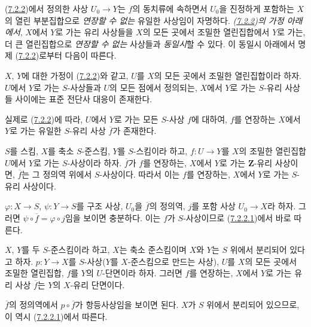 (\hyperref[I.7.2.2-ko]{7.2.2})에서 정의한 사상 $U_0\to Y$는 $f$의
동치류에 속하면서 $U_0$을 진정하게 포함하는 $X$의 열린 부분집합으로
\emph{연장할 수 없는} 유일한 사상임이 자명하다.
\emph{(\hyperref[I.7.2.2-ko]{7.2.2})의 가정 아래에서}, $X$에서 $Y$로
가는 유리 사상들을 $X$의 모든 곳에서 조밀한 열린집합에서 $Y$로 가는,
더 큰 열린집합으로 \emph{연장할 수 없는} 사상들과 \emph{동일시}할 수
있다. 이 동일시 아래에서 명제
(\hyperref[I.7.2.2-ko]{7.2.2})로부터 다음이 따른다.

\begin{corollary}[7.2.3]
\label{I.7.2.3-ko}
$X$, $Y$에 대한 가정이 (\hyperref[I.7.2.2-ko]{7.2.2})와 같고,
$U$를 $X$의 모든 곳에서 조밀한 열린집합이라 하자. $U$에서 $Y$로
가는 $S$-사상들과 $U$의 모든 점에서 정의되는, $X$에서 $Y$로 가는
$S$-유리 사상들 사이에는 표준 전단사 대응이 존재한다.
\end{corollary}

실제로 (\hyperref[I.7.2.2-ko]{7.2.2})에 따라, $U$에서 $Y$로 가는 모든
$S$-사상 $f$에 대하여, $f$를 연장하는 $X$에서 $Y$로 가는 유일한 $S$-유리 사상
$\overline f$가 존재한다.

\begin{corollary}[7.2.4]
\label{I.7.2.4-ko}
$S$를 스킴, $X$를 축소 $S$-준스킴, $Y$를 $S$-스킴이라 하고,
$f:U\to Y$를 $X$의 조밀한 열린집합 $U$에서 $Y$로 가는 $S$-사상이라
하자. $\overline f$가 $f$를 연장하는, $X$에서 $Y$로 가는
$\mathbf{Z}$-유리 사상이면, $\overline f$는 그 정의역 위에서
$S$-사상이다. 따라서 이는 $f$를 연장하는, $X$에서 $Y$로 가는
$S$-유리 사상이다.
\end{corollary}

$\varphi:X\to S$, $\psi:Y\to S$를 구조 사상, $U_0$을 $\overline f$의
정의역, $j$를 포함 사상 $U_0\to X$라 하자. 그러면
$\psi\circ\overline f=\varphi\circ j$임을 보이면 충분하다. 이는 $f$가
$S$-사상이므로 (\hyperref[I.7.2.2.1-ko]{7.2.2.1})에서 바로 따른다.

\begin{corollary}[7.2.5]
\label{I.7.2.5-ko}
$X$, $Y$를 두 $S$-준스킴이라 하고, $X$는 축소 준스킴이며 $X$와 $Y$는
$S$ 위에서 분리되어 있다고 하자. $p:Y\to X$를 $S$-사상($Y$를
$X$-준스킴으로 만드는 사상), $U$를 $X$의 모든 곳에서 조밀한
열린집합, $f$를 $Y$의 $U$-단면이라 하자. 그러면 $f$를 연장하는,
$X$에서 $Y$로 가는 유리 사상 $\overline f$는 $Y$의 $X$-유리
단면이다.
\end{corollary}

$\overline f$의 정의역에서 $p\circ\overline f$가 항등사상임을 보이면
된다. $X$가 $S$ 위에서 분리되어 있으므로, 이 역시
(\hyperref[I.7.2.2.1-ko]{7.2.2.1})에서 따른다.

